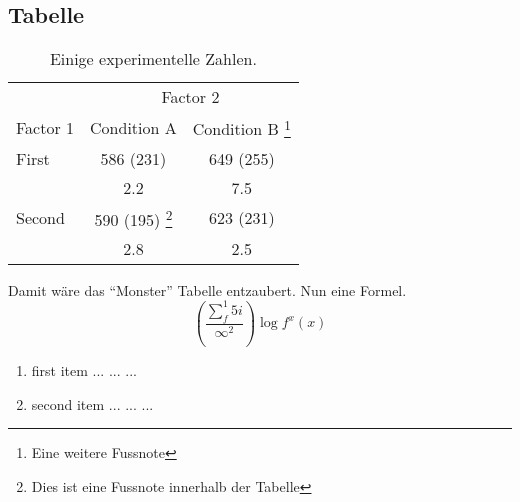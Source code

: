 \subsection{Tabelle}
\begin{table}[htb]
\begin{minipage}{\linewidth}
\renewcommand{\footnoterule}{}
\renewcommand{\thefootnote}{\alph{footnote}}
\caption{Einige experimentelle Zahlen.}
\label{tab:tab1}
\centering
\begin{tabular}{lcc}
\toprule
          & \multicolumn{2}{c}{Factor 2} \\ 
          	\cmidrule{2-3}
Factor 1  & Condition A  & Condition B \footnote{Eine weitere Fussnote}  \\ 
\midrule
First     & 586 (231)    & 649 (255)     \\
          &    2.2       &    7.5        \\
Second    & 590 (195) \footnote{Dies ist eine Fussnote innerhalb der Tabelle}   & 623 (231)     \\
          &    2.8       &    2.5        \\ 
\bottomrule
\end{tabular}
\end{minipage}
\end{table}
Damit wäre das \enquote{Monster} Tabelle entzaubert.
Nun eine Formel.
\begin{equation}
\left( \frac { \sum _{ f }^{ 1 }{ 5i }  }{ { \infty  }^{ 2 } }  \right) \log { f^{ x }\left( x \right)  } 
\label{eq:Equ01}
\end{equation}

\begin{enumerate}
	 \item first item ... ... ...
     \item second item ... ... ...
\end{enumerate}

